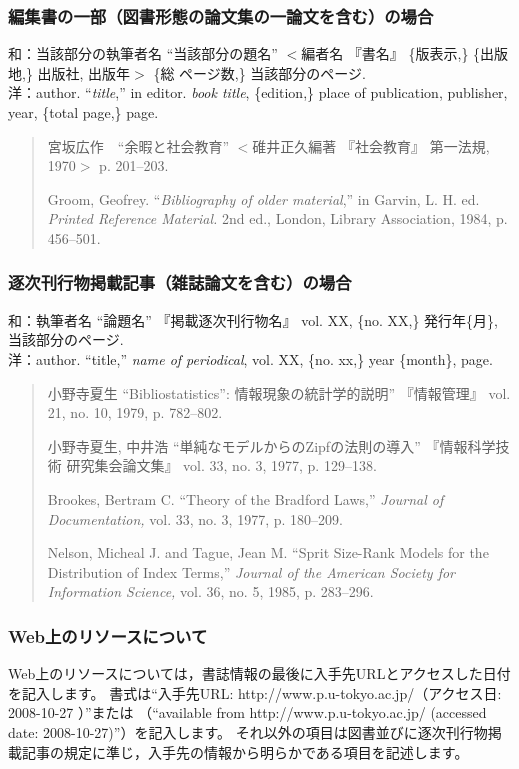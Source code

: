 \documentclass[b5paper,10pt,twocolumn,tombow]{jarticle}
\begin{document}
\subsubsection{編集書の一部（図書形態の論文集の一論文を含む）の場合}
\noindent{}和：当該部分の執筆者名 ``当該部分の題名'' $<$編者名 『書名』 \{版表示,\} \{出版地,\} 出版社, 出版年$>$ \{総
\bigskip
ページ数,\} 当該部分のページ.\\
洋：author. ``\textit{title},'' in editor. \textit{book title}, \{edition,\} place of publication,
publisher, year, \{total page,\} page.

\begin{quote}
宮坂広作　``余暇と社会教育'' $<$碓井正久編著 『社会教育』 第一法規,
 1970$>$ p. 201--203.

Groom, Geofrey. ``\textit{Bibliography of older material},'' in Garvin,
 L. H. ed. \textit{Printed Reference Material.} 2nd ed., London, Library
 Association, 1984, p. 456--501.
\end{quote}


\subsubsection{逐次刊行物掲載記事（雑誌論文を含む）の場合}
\noindent{}和：執筆者名 ``論題名'' 『掲載逐次刊行物名』 vol. XX,
\{no. XX,\} 発行年\{月\}, 当該部分のページ.\\
洋：author. ``title,'' \textit{name of periodical}, vol. XX,
\{no. xx,\} year \{month\}, page.


\begin{quote}
小野寺夏生 ``Bibliostatistics'': 情報現象の統計学的説明'' 『情報管理』
 vol. 21, no. 10, 1979, p. 782--802.

小野寺夏生, 中井浩 ``単純なモデルからのZipfの法則の導入'' 『情報科学技術
 研究集会論文集』 vol. 33, no. 3, 1977, p. 129--138.

Brookes, Bertram C. ``Theory of the Bradford Laws,'' \textit{Journal of
 Documentation,} vol. 33, no. 3, 1977, p. 180--209.

Nelson, Micheal J. and Tague, Jean M. ``Sprit Size-Rank Models for the
 Distribution of Index Terms,'' \textit{Journal of the American Society
 for Information Science,} vol. 36, no. 5, 1985, p. 283--296.
\end{quote}

\subsubsection{Web上のリソースについて}
Web上のリソースについては，書誌情報の最後に入手先URLとアクセスした日付を記入します。
書式は``入手先URL: http://www.p.u-tokyo.ac.jp/（アクセス日: 2008-10-27 ）''または
（``available from http://www.p.u-tokyo.ac.jp/ (accessed date: 2008-10-27)''）を記入します。
それ以外の項目は図書並びに逐次刊行物掲載記事の規定に準じ，入手先の情報から明らかである項目を記述します。
\end{document}
